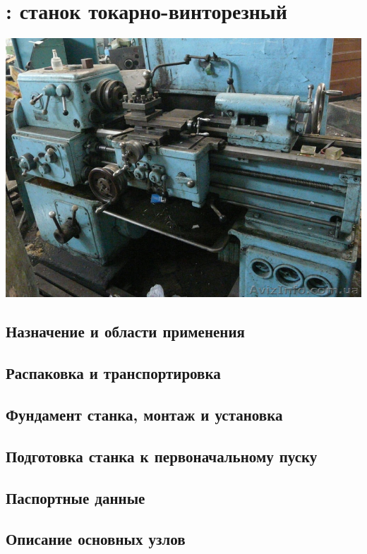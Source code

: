 \clearpage
\section{\odina: станок токарно-винторезный}

\includegraphics[height=0.5\textheight]{stanki/1A616.jpg}

\subsection{Назначение и области применения}

\subsection{Распаковка и транспортировка}

\subsection{Фундамент станка, монтаж и установка}

\subsection{Подготовка станка к первоначальному пуску}

\subsection{Паспортные данные}

\subsection{Описание основных узлов}


